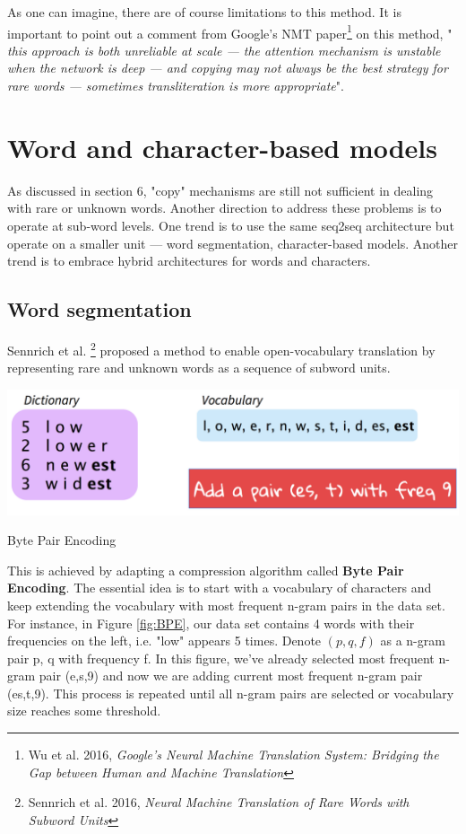 \documentclass{tufte-handout}
\begin{document}
As one can imagine, there are of course limitations to this method. It is important to point out a comment from Google's NMT paper\footnote{Wu et al. 2016, \textit{Google's Neural Machine Translation System: Bridging the Gap
between Human and Machine Translation}} on this method, " \textit{this approach is both unreliable
at scale --- the attention mechanism is unstable when
the network is deep --- and copying may not always be
the best strategy for rare words --- sometimes
transliteration is more appropriate}".



\section{Word and character-based models}
As discussed in section 6, "copy" mechanisms are still not sufficient in dealing with rare or unknown words. Another direction to address these problems is to operate at sub-word levels. One trend is to use the same seq2seq architecture but operate on a smaller unit --- word segmentation, character-based models. Another trend is to embrace hybrid architectures for words and characters.

\subsection{Word segmentation}
Sennrich et al. \footnote{Sennrich et al. 2016, \textit{Neural Machine Translation of Rare Words with Subword Units}} proposed a method to enable open-vocabulary translation by representing rare and unknown words as a sequence of subword units.

\begin{marginfigure}
	\centering
	\includegraphics[width=0.9\linewidth]{BPE.png}
	\caption {Byte Pair Encoding}
	\label{fig:BPE}
\end{marginfigure}

This is achieved by adapting a compression algorithm called \textbf{Byte Pair Encoding}. The essential idea is to start with a vocabulary of characters and keep extending the vocabulary with most frequent n-gram pairs in the data set. For instance, in Figure \ref{fig:BPE}, our data set contains 4 words with their frequencies on the left, i.e. "low" appears 5 times. Denote $(p,q,f)$ as a n-gram pair p, q with frequency f. In this figure, we've already selected most frequent n-gram pair (e,s,9) and now we are adding current most frequent n-gram pair (es,t,9). This process is repeated until all n-gram pairs are selected or vocabulary size reaches some threshold.
\end{document}
